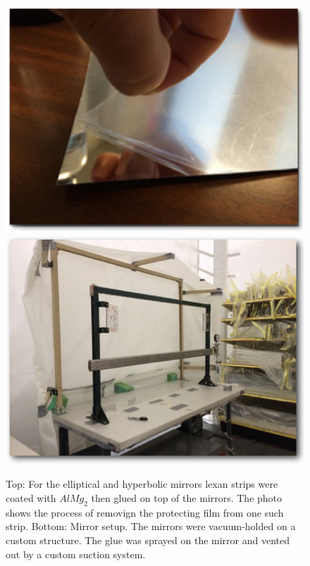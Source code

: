 \begin{figure}[t]
\centering
	\includegraphics[width=0.98\columnwidth,keepaspectratio]{img/filmOnStrip.png}
	\includegraphics[width=0.98\columnwidth,keepaspectratio]{img/mirrorSetup.png}
	\caption{Top: For the elliptical and hyperbolic mirrors lexan strips were coated with $AlMg_2$
             then glued on top of the mirrors. The photo shows the process of removign the
             protecting film from one such strip. Bottom: Mirror setup. The mirrors were
             vacuum-holded on a custom structure. The glue was sprayed on the mirror and
             vented out by a custom suction system.}
	\label{fig:filmOnStrip}
\end{figure}


